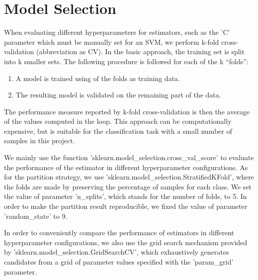 \documentclass[10pt,journal,compsoc]{IEEEtran}
\begin{document}
\section{Model Selection}
\label{sec:model_selection}

When evaluating different hyperparameters for estimators, such as the 'C' parameter which must be manually set for an SVM, we perform k-fold cross-validation (abbreviation as CV). In the basic approach, the training set is split into k smaller sets. The following procedure is followed for each of the k “folds”:
\begin{enumerate}
  \item A model is trained using  of the folds as training data.
  \item The resulting model is validated on the remaining part of the data.
\end{enumerate}
The performance measure reported by k-fold cross-validation is then the average of the values computed in the loop. This approach can be computationally expensive, but is suitable for the classification task with a small number of samples in this project.

We mainly use the function 'sklearn.model\_selection.cross\_val\_score' to evaluate the performance of the estimator in different hyperparameter configurations. As for the partition strategy, we use 'sklearn.model\_selection.StratifiedKFold', where the folds are made by preserving the percentage of samples for each class. We set the value of parameter 'n\_splits', which stands for the number of folds, to 5. In order to make the partition result reproducible, we fixed the value of parameter 'random\_state' to 9. 

In order to conveniently compare the performance of estimators in different hyperparameter configurations, we also use the grid search mechanism provided by 'sklearn.model\_selection.GridSearchCV', which  exhaustively generates candidates from a grid of parameter values specified with the 'param\_grid' parameter.
\end{document}

